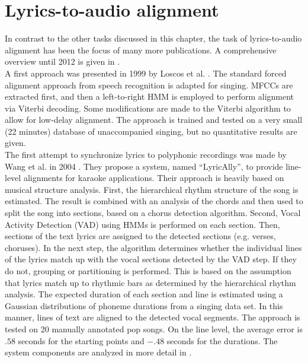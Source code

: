 \section{Lyrics-to-audio alignment}
In contrast to the other tasks discussed in this chapter, the task of lyrics-to-audio alignment has been the focus of many more publications. A comprehensive overview until 2012 is given in \cite{goto_alignment}.\\
A first approach was presented in 1999 by Loscos et al. \cite{Loscos1999}. The standard forced alignment approach from speech recognition is adapted for singing. MFCCs are extracted first, and then a left-to-right HMM is employed to perform alignment via Viterbi decoding. Some modifications are made to the Viterbi algorithm to allow for low-delay alignment. The approach is trained and tested on a very small (22 minutes) database of unaccompanied singing, but no quantitative results are given.\\
The first attempt to synchronize lyrics to polyphonic recordings was made by Wang et al. in 2004 \cite{Wang2004}. They propose a system, named ``LyricAlly'', to provide line-level alignments for karaoke applications. Their approach is heavily based on musical structure analysis. First, the hierarchical rhythm structure of the song is estimated. The result is combined with an analysis of the chords and then used to split the song into sections, based on a chorus detection algorithm. Second, Vocal Activity Detection (VAD) using HMMs is performed on each section. Then, sections of the text lyrics are assigned to the detected sections (e.g. verses, choruses). In the next step, the algorithm determines whether the individual lines of the lyrics match up with the vocal sections detected by the VAD step. If they do not, grouping or partitioning is performed. This is based on the assumption that lyrics match up to rhythmic bars as determined by the hierarchical rhythm analysis. The expected duration of each section and line is estimated using a Gaussian distributions of phoneme durations from a singing data set. In this manner, lines of text are aligned to the detected vocal segments. The approach is tested on 20 manually annotated pop songs. On the line level, the average error is $.58$ seconds for the starting points and $-.48$ seconds for the durations. The system components are analyzed in more detail in \cite{lyrically}.\\
